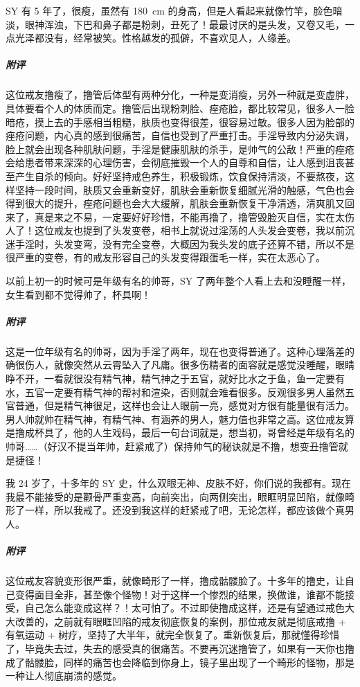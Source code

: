 \begin{case}[变丑]
    SY 有 5 年了，很瘦，虽然有 \SI{180}{\centi\metre} 的身高，但是人看起来就像竹竿，脸色暗淡，眼神浑浊，下巴和鼻子都是粉刺，丑死了！最最讨厌的是头发，又卷又毛，一点光泽都没有，经常被笑。性格越发的孤僻，不喜欢见人，人缘差。
    \subparagraph{附评} 这位戒友撸瘦了，撸管后体型有两种分化，一种是变消瘦，另外一种就是变虚胖，具体要看个人的体质而定。撸管后出现粉刺脸、痤疮脸，都比较常见，很多人一脸暗疮，摸上去的手感相当粗糙，肤质也变得很差，很容易过敏。很多人因为脸部的痤疮问题，内心真的感到很痛苦，自信也受到了严重打击。手淫导致内分泌失调，脸上就会出现各种肌肤问题，手淫是健康肌肤的杀手，是帅气的公敌！严重的痤疮会给患者带来深深的心理伤害，会彻底摧毁一个人的自尊和自信，让人感到沮丧甚至产生自杀的倾向。好好坚持戒色养生，积极锻炼，饮食保持清淡，不要熬夜，这样坚持一段时间，肤质又会重新变好，肌肤会重新恢复细腻光滑的触感，气色也会得到很大的提升，痤疮问题也会大大缓解，肌肤会重新恢复干净清透，清爽肌又回来了，真是来之不易，一定要好好珍惜，不能再撸了，撸管毁脸灭自信，实在太伤人了！这位戒友也提到了头发变卷，相书上就说过淫荡的人头发会变卷，我以前沉迷手淫时，头发变弯，没有完全变卷，大概因为我头发的底子还算不错，所以不是很严重的变卷，有的戒友形容自己的头发变得跟蛋毛一样，实在太恶心了。
\end{case}

\begin{case}[变丑]
    以前上初一的时候可是年级有名的帅哥，SY 了两年整个人看上去和没睡醒一样，女生看到都不觉得帅了，杯具啊！
    \subparagraph{附评} 这是一位年级有名的帅哥，因为手淫了两年，现在也变得普通了。这种心理落差的确很伤人，就像突然从云霄坠入了凡庸。很多伤精者的面容就是感觉没睡醒，眼睛睁不开，一看就很没有精气神，精气神之于五官，就好比水之于鱼，鱼一定要有水，五官一定要有精气神的帮衬和渲染，否则就会难看很多。反观很多男人虽然五官普通，但是精气神很足，这样也会让人眼前一亮，感觉对方很有能量很有活力。男人帅就帅在精气神，有精气神、有涵养的男人，魅力值也非常之高。这位戒友算是撸成杯具了，他的人生戏码，最后一句台词就是，想当初，哥曾经是年级有名的帅哥……（好汉不提当年帅，赶紧戒了）保持帅气的秘诀就是不撸，想变丑撸管就是捷径！
\end{case}

\begin{case}[变丑]
    我 24 岁了，十多年的 SY 史，什么双眼无神、皮肤不好，你们说的我都有。现在我最不能接受的是颧骨严重变高，向前突出，向两侧突出，眼眶明显凹陷，就像畸形了一样，所以我戒了。还没到我这样的赶紧戒了吧，无论怎样，都应该做个真男人。
    \subparagraph{附评} 这位戒友容貌变形很严重，就像畸形了一样，撸成骷髅脸了。十多年的撸史，让自己变得面目全非，甚至像个怪物！对于这样一个惨烈的结果，换做谁，谁都不能接受，自己怎么能变成这样？！太可怕了。不过即使撸成这样，还是有望通过戒色大大改善的，之前就有眼眶凹陷的戒友彻底恢复的案例，那位戒友就是彻底戒撸 + 有氧运动 + 树疗，坚持了大半年，就完全恢复了。重新恢复后，那就懂得珍惜了，毕竟失去过，失去的感受真的很痛苦。不要再沉迷撸管了，如果有一天你也撸成了骷髅脸，同样的痛苦也会降临到你身上，镜子里出现了一个畸形的怪物，那是一种让人彻底崩溃的感觉。
\end{case}


